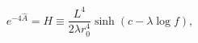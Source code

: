 \begin{equation}
e^{-4\hat A}=H\equiv\frac {L^4}{2\lambda r_0^4}
\sinh(c-\lambda\log f),
\end{equation}


